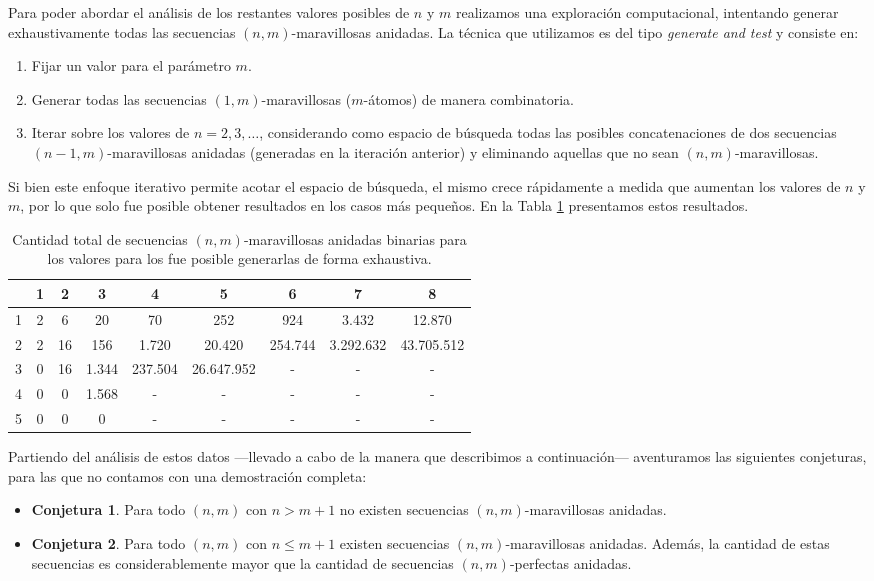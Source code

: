 Para poder abordar el análisis de los restantes valores posibles de $n$ y $m$
realizamos una exploración computacional, intentando generar exhaustivamente
todas las secuencias $(n,m)$-maravillosas anidadas.
La técnica que utilizamos es del tipo \emph{generate and test} y consiste en:
\begin{enumerate}[label=\arabic*.]
	\item Fijar un valor para el parámetro $m$.
	\item Generar todas las secuencias $(1,m)$-maravillosas ($m$-átomos) de manera
	combinatoria.
	\item Iterar sobre los valores de $n = 2, 3, \dots$, considerando como espacio
	de búsqueda todas las posibles concatenaciones de dos secuencias
	$(n-1, m)$-maravillosas anidadas (generadas en la iteración anterior) y
	eliminando aquellas que no sean $(n,m)$-maravillosas.
\end{enumerate}
Si bien este enfoque iterativo permite acotar el espacio de búsqueda, el mismo
crece rápidamente a medida que aumentan los valores de $n$ y $m$, por lo que
solo fue posible obtener resultados en los casos más pequeños.
En la Tabla \ref{table:nested-marvellous-count} presentamos estos resultados.

\begin{table}[H]
	\centering
	\begin{tabular}{|c|c|c|c|c|c|c|c|c|}
		\hline
		\diagbox[width=3em]{$n$}{$m$}
		  & 1 & 2  & 3     & 4       & 5          & 6       & 7         & 8          \\
		\hline
		1 & 2 & 6  & 20    & 70      & 252        & 924     & 3.432     & 12.870     \\ \hline
		2 & 2 & 16 & 156   & 1.720   & 20.420     & 254.744 & 3.292.632 & 43.705.512 \\
		\hline
		3 & 0 & 16 & 1.344 & 237.504 & 26.647.952 & -       & -         & -          \\
		\hline
		4 & 0 & 0  & 1.568 & -       & -          & -       & -         & -          \\
		\hline
		5 & 0 & 0  & 0     & -       & -          & -       & -         & -          \\
		\hline
	\end{tabular}
	\caption{Cantidad total de secuencias $(n,m)$-maravillosas anidadas binarias
		para los valores para los fue posible generarlas de forma exhaustiva.}
	\label{table:nested-marvellous-count}
\end{table}

Partiendo del análisis de estos datos ---llevado a cabo de la manera que
describimos a continuación--- aventuramos las siguientes conjeturas, para las que
no contamos con una demostración completa:
\begin{itemize}
	\item \textbf{Conjetura 1}. Para todo $(n,m)$ con $n > m + 1$ no existen
		secuencias $(n,m)$-maravillosas anidadas.
	\item \textbf{Conjetura 2}. Para todo $(n,m)$ con $n \leq m + 1$ existen
	secuencias $(n,m)$-maravillosas anidadas. Además, la cantidad de estas
	secuencias es considerablemente mayor que la cantidad de secuencias
	$(n,m)$-perfectas anidadas.
\end{itemize}

